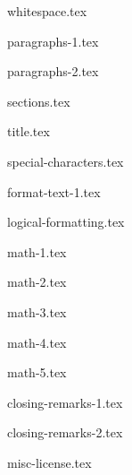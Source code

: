 \documentclass[allauthors]{../../cursuspresentatie}
\def\importslide#1#2{%
	{#2}
}
\begin{document}
\importslide{beginners}{whitespace.tex}

\importslide{beginners}{paragraphs-1.tex}
\importslide{beginners}{paragraphs-2.tex}



\importslide{beginners}{sections.tex}


\importslide{beginners}{title.tex}


\importslide{beginners}{special-characters.tex}

\importslide{beginners}{format-text-1.tex}

\importslide{beginners}{logical-formatting.tex}


\importslide{beginners}{math-1.tex}

\importslide{beginners}{math-2.tex}


\importslide{beginners}{math-3.tex}

\importslide{beginners}{math-4.tex}

\importslide{beginners}{math-5.tex}


\importslide{beginners}{closing-remarks-1.tex}
\importslide{beginners}{closing-remarks-2.tex}

	
\importslide{misc}{misc-license.tex}
\end{document}
